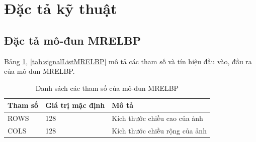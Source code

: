 \section{ Đặc tả kỹ thuật}



\subsection{Đặc tả mô-đun MRELBP}

Bảng \ref{tab:paramListMRELBP}, \ref{tab:signalListMRELBP} mô tả các tham số và tín hiệu đầu vào, đầu ra của mô-đun MRELBP. 
\begin{table}[h]
    \centering
    \renewcommand{\arraystretch}{1.3} %
        \caption{Danh sách các tham số của mô-đun MRELBP }
    \begin{tabular}{|p{3cm} p{4cm} p{8cm}|}
        \hline
        \rowcolor{gray!30}
        \textbf{Tham số } & \textbf{Giá trị mặc định}  & \textbf{Mô tả} \\
        \hline
        ROWS & 128 & Kích thước chiều cao của ảnh
        \\ \hline
        COLS & 128 & Kích thước chiều rộng của ảnh
        \\ \hline
    \end{tabular}

    \label{tab:paramListMRELBP}
\end{table}

